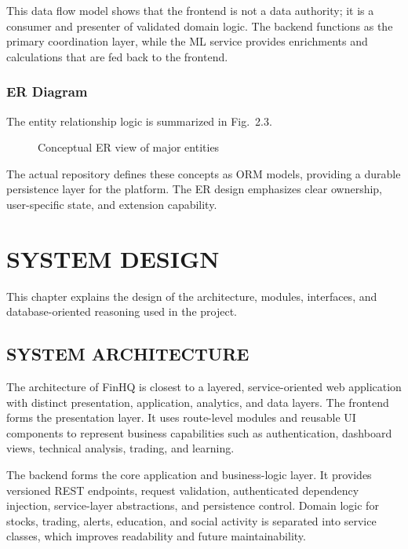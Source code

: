 \documentclass[12pt,a4paper]{report}
\newcommand{\projectshort}{FinHQ}
\begin{document}
This data flow model shows that the frontend is not a data authority; it is a consumer and presenter of validated domain logic. The backend functions as the primary coordination layer, while the ML service provides enrichments and calculations that are fed back to the frontend.

\subsection{ER Diagram}
The entity relationship logic is summarized in Fig.~2.3.

\begin{figure}[H]
\centering
{}
\caption{Conceptual ER view of major entities}
\end{figure}

The actual repository defines these concepts as ORM models, providing a durable persistence layer for the platform. The ER design emphasizes clear ownership, user-specific state, and extension capability.

\chapter{SYSTEM DESIGN}
This chapter explains the design of the architecture, modules, interfaces, and database-oriented reasoning used in the project.

\section{SYSTEM ARCHITECTURE}
The architecture of \projectshort{} is closest to a layered, service-oriented web application with distinct presentation, application, analytics, and data layers. The frontend forms the presentation layer. It uses route-level modules and reusable UI components to represent business capabilities such as authentication, dashboard views, technical analysis, trading, and learning.

The backend forms the core application and business-logic layer. It provides versioned REST endpoints, request validation, authenticated dependency injection, service-layer abstractions, and persistence control. Domain logic for stocks, trading, alerts, education, and social activity is separated into service classes, which improves readability and future maintainability.
\end{document}
